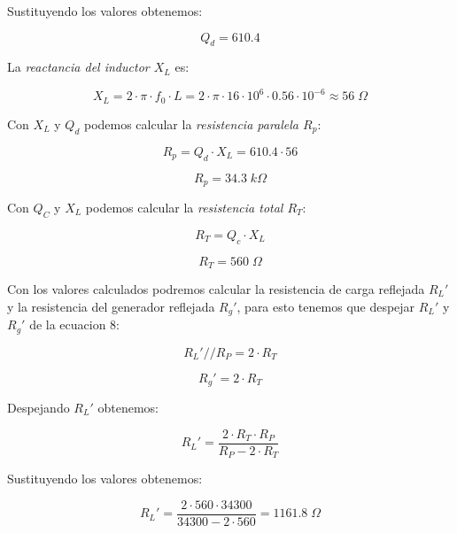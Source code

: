 Sustituyendo los valores obtenemos:

\begin{equation}
    \boxed{Q_d = 610.4}
\end{equation}

La \textit{reactancia del inductor $X_L$} es:

\begin{equation}
    X_L = 2 \cdot \pi \cdot f_0 \cdot L = 2 \cdot \pi \cdot 16 \cdot 10^6 \cdot 0.56 \cdot 10^{-6} \approx 56\; \Omega
\end{equation}

Con $X_L$ y $Q_d$ podemos calcular la \textit{resistencia paralela $R_p$}:

\begin{equation}
    R_p = Q_d \cdot X_L = 610.4 \cdot 56 
\end{equation}

\begin{equation}
    \boxed{R_p = 34.3\; k\Omega}
\end{equation}

Con $Q_C$ y $X_L$ podemos calcular la \textit{resistencia total $R_T$}:

\begin{equation}
    R_T = Q_c \cdot X_L
\end{equation}

\begin{equation}
    \boxed{R_T = 560\; \Omega}
\end{equation}

Con los valores calculados podremos calcular la resistencia de carga reflejada $R_L'$ y la resistencia del generador reflejada $R_g'$, para esto tenemos que despejar $R_L'$ y $R_g'$ de la ecuacion 8:

\begin{equation}
    R_L' // R_P = 2 \cdot R_T 
\end{equation}

\begin{equation}
    R_g' = 2 \cdot R_T 
\end{equation}

Despejando $R_L'$ obtenemos:

\begin{equation}
    R_L' = \frac{2 \cdot R_T \cdot R_P}{R_P - 2 \cdot R_T} 
\end{equation}

Sustituyendo los valores obtenemos:

\begin{equation}
    R_L' = \frac{2 \cdot 560 \cdot 34300}{34300 - 2 \cdot 560} = 1161.8\; \Omega
\end{equation}

